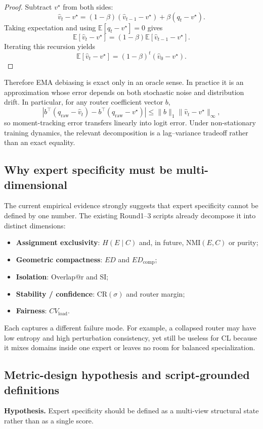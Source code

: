\documentclass[11pt]{article}
\begin{document}
\begin{proof}
Subtract $v^\star$ from both sides:
\[
\hat v_t-v^\star
=
(1-\beta)(\hat v_{t-1}-v^\star)+\beta(q_t-v^\star).
\]
Taking expectation and using $\mathbb E[q_t-v^\star]=0$ gives
\[
\mathbb E[\hat v_t-v^\star]
=
(1-\beta)\mathbb E[\hat v_{t-1}-v^\star].
\]
Iterating this recursion yields
\[
\mathbb E[\hat v_t-v^\star]=(1-\beta)^t(\hat v_0-v^\star).
\]
\end{proof}

Therefore EMA debiasing is exact only in an oracle sense. In practice it is an approximation whose error depends on both stochastic noise and distribution drift. In particular, for any router coefficient vector $b$,
\[
\left|b^\top(q_{\mathrm{raw}}-\hat v_t)-b^\top(q_{\mathrm{raw}}-v^\star)\right|
\le
\|b\|_1\|\hat v_t-v^\star\|_\infty,
\]
so moment-tracking error transfers linearly into logit error. Under non-stationary training dynamics, the relevant decomposition is a lag--variance tradeoff rather than an exact equality.

\subsection{Why expert specificity must be multi-dimensional}
The current empirical evidence strongly suggests that expert specificity cannot be defined by one number. The existing Round1--3 scripts already decompose it into distinct dimensions:
\begin{itemize}
    \item \textbf{Assignment exclusivity}: $H(E\mid C)$ and, in future, NMI$(E,C)$ or purity;
    \item \textbf{Geometric compactness}: $ED$ and $ED_{\mathrm{comp}}$;
    \item \textbf{Isolation}: Overlap@r and SI;
    \item \textbf{Stability / confidence}: CR$(\sigma)$ and router margin;
    \item \textbf{Fairness}: $CV_{\mathrm{load}}$.
\end{itemize}
Each captures a different failure mode. For example, a collapsed router may have low entropy and high perturbation consistency, yet still be useless for CL because it mixes domains inside one expert or leaves no room for balanced specialization.

\subsection{Metric-design hypothesis and script-grounded definitions}
\textbf{Hypothesis.} Expert specificity should be defined as a multi-view structural state rather than as a single score.
\end{document}

